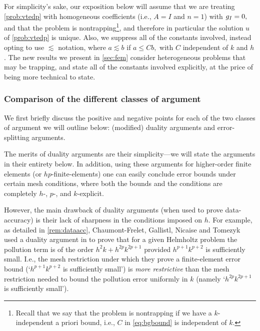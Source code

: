 For simplicity's sake, our exposition below will assume that we are treating \cref{prob:vtedp} with homogeneous coefficients (i.e., $A=I$ and $n=1$) with $g_{I} = 0,$ and that the problem is nontrapping\footnote{Recall that we say that the problem is nontrapping if we have a $k$-independent a priori bound, i.e., $C$ in \cref{eq:bgbound} is independent of $k.$}, and therefore in particular the solution $u$ of \cref{prob:vtedp} is unique. Also, we suppress all of the constants involved, instead opting to use $\lesssim$ notation, where $a \lesssim b$ if $a \leq C b,$ with $C$ independent of $k$ and $h$. The new results we present in \cref{sec:fem} consider heterogeneous problems that may be trapping, and state all of the constants involved explicitly, at the price of being more technical to state.

\subsubsection{Comparison of the different classes of argument}
We first briefly discuss the positive and negative points for each of the two classes of argument we will outline below: (modified) duality arguments and error-splitting arguments.

The merits of duality arguments are their simplicity---we will state the arguments in their entirety below. In addition, using these arguments for higher-order finite elements (or $hp$-finite-elements) one can easily conclude error bounds under certain mesh conditions, where both the bounds and the conditions are completely $h$-, $p$-, and $k$-explicit.%

However, the main drawback of duality arguments (when used to prove data-accuracy) is their lack of sharpness in the conditions imposed on $h$. For example, as detailed in \cref{rem:dataacc}, Chaumont-Frelet, Gallistl, Nicaise and Tomezyk used a duality argument in \cite{ChGaNiTo:18} to prove that for a given Helmholtz problem the pollution term is of the order $h^2k + h^{2p}k^{2p+1}$ provided $h^{p+1}k^{p+2}$ is sufficiently small. I.e., the mesh restriction under which they prove a finite-element error bound (`$h^{p+1}k^{p+2}$ is sufficiently small') is \emph{more restrictive} than the mesh restriction needed to bound the pollution error uniformly in $k$ (namely `$h^{2p}k^{2p+1}$ is sufficiently small').

